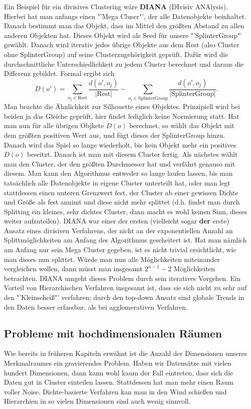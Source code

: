 Ein Beispiel für ein divisives Clustering wäre \textbf{DIANA} (DIvisiv ANAlysis).
Hierbei hat man anfangs einen "'Mega Cluser"', der alle Datenobjekte beinhaltet.
Danach bestimmt man das Objekt, dass im Mittel den größten Abstand zu allen
anderen Objekten hat. Dieses Objekt wird als Seed für unsere "'SplinterGroup"'
gewählt. Danach wird iterativ jedes übrige Objekte aus dem Rest (also Cluster
ohne SplinterGroup) auf seine Clusterzugehörigkeit geprüft. Dafür wird die
durchschnittliche Unterschiedlichkeit zu jedem Cluster berechnet und daraus
die Differenz gebildet. Formal ergibt sich
\[D(o') = \sum_{o_j \in \text{Rest}} \frac{d(o',o_j)}{\left| \text{Rest}
\right|} - \sum_{o_j \in \text{SplinterGroup}} \frac{d(o',o_j)}{\left|
\text{SplinterGroup} \right|}.\]
Man beachte die Ähnlichkeit zur Silhouette eines Objektes. Prinzipiell wird bei
beiden ja das Gleiche geprüft, hier findet lediglich keine Normierung statt.
Hat man nun für alle übrigen Objkete \(D(o)\) berechnet, so wählt das Objekt
mit dem größten positiven Wert aus, und fügt dieses der SplinterGroup hinzu. 
Danach wird das Spiel so lange wiederholt, bis kein Objekt mehr ein positives 
\(D(o)\) beseitzt. Danach ist man mit diesem Cluster fertig. Als nächstes wählt
man den Cluster, der den größten Durchmesser hat und verfährt genauso mit 
diesem. Man kann den Algorithmus entweder so lange laufen lassen, bis man
tatsächlich alle Datenobjekte in eigene Cluster unterteilt hat, oder man legt
stattdessen einen unteren Grenzwert fest, der Cluster ab einer gewissen Dichte
und Größe als fest annimt und diese nicht mehr splittet (d.h. findet man durch
Splitting ein kleines, sehr dichtes Cluster, dann macht es wohl keinen Sinn, 
dieses weiter aufzuteilen). DIANA war einer der ersten (vielleicht sogar 
\textbf{der} erste) Ansatz eines divisiven Verfahrens, der nicht an der
exponentiellen Anzahl an Splittmöglichkeiten am Anfang des Algorithmus
gescheitert ist. Hat man nämlich am Anfang nur sein Mega Cluster gegeben, ist
es nicht trivial ersichtlicht, wie man dieses nun splittet. Würde man nun alle
Möglichkeiten miteinander vergleichen wollen, dann müsst man insgesamt
\(2^{n-1}-2\) Möglichkeiten betrachten. DIANA umgeht dieses Problem durch
sein iteratives Vorgehen. Ein Vorteil von Hierarchischen Verfahren insgesamt ist,
dass sie sich nicht zu sehr auf den "'Kleinscheiß"' verfahren; durch den top-down
Ansatz sind globale Trends in den Daten besser erfassbar, als bei 
agglomerativen Verfahren.

\subsection{Probleme mit hochdimensionalen Räumen}
Wie bereits in früheren Kapiteln erwähnt ist die Anzahl der Dimensionen unseres
Merkmalraumes ein gravierendes Problem. Haben wir Datensätze mit vielen 
hundert Dimensionen, dann kann wohl kaum der Fall eintreten, dass sich die
Daten gut in Cluster einteilen lassen. Stattdessen hat man mehr einen Raum
voller Noise. Dichte-basierte Verfahren kan man in den Wind schießen und
Hierarchien in so vielen Dimensionen sind auch wenig sinnvoll.

